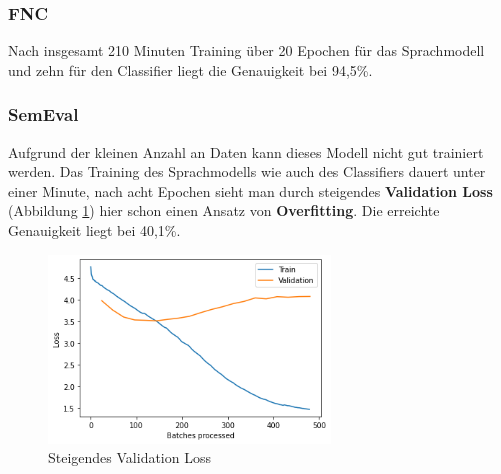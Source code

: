 \subsubsection*{FNC}
Nach insgesamt 210 Minuten Training \"uber 20 Epochen f\"ur das Sprachmodell und zehn f\"ur den Classifier liegt die Genauigkeit bei 94,5\%.

\subsubsection*{SemEval}
Aufgrund der kleinen Anzahl an Daten kann dieses Modell nicht gut trainiert werden. Das Training des Sprachmodells wie auch des Classifiers dauert unter einer Minute, nach acht Epochen sieht man durch steigendes \textbf{Validation Loss} (Abbildung \ref{fig:rising_validation}) hier schon einen Ansatz von \textbf{Overfitting}. Die erreichte Genauigkeit liegt bei 40,1\%.
\begin{figure}[!ht]
\centering
\includegraphics[height=5cm]{pics/rising_validation_loss.png}
\caption{Steigendes Validation Loss}
\label{fig:rising_validation}
\end{figure}

